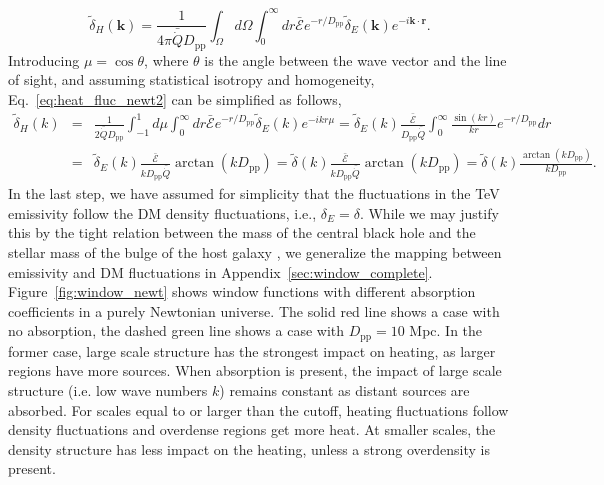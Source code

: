 \documentclass[numberedappendix]{emulateapj}
\begin{document}
\begin{equation}
  \label{eq:heat_fluc_newt2}
  \tilde{\delta}_H(\mathbf{k})=\frac{1}{4\pi\bar{\dot{Q}}D_{\mathrm{pp}}} \int_{\Omega}d\Omega\int_0^{\infty}  dr \bar{ \mathcal{E}} e^{- r/D_{\mathrm{pp}}}  \tilde{\delta}_E(\mathbf{k}) e^{-i\mathbf{k}\cdot{\mathbf{r}}}.
\end{equation}
Introducing $\mu=\cos\theta$, where $\theta$ is the angle between the wave vector and the line of sight, and assuming statistical isotropy and homogeneity, Eq.~\eqref{eq:heat_fluc_newt2} can be simplified as follows,
\begin{eqnarray}
  \label{eq:heat_fluc_newt3}
  \tilde{\delta}_H(k)&=&  
  \frac{1}{2\bar{\dot{Q}}D_{\mathrm{pp}}} \int_{-1}^{1} d\mu \int_0^{\infty}dr  \bar{\mathcal{E}} e^{-r/D_{\mathrm{pp}}} \tilde{\delta}_E(k) e^{-ikr\mu}
  =\tilde{\delta}_E(k)\frac{\bar{\mathcal{E}}}{D_{\mathrm{pp}} \bar{\dot{Q}}}\int_0^{\infty} \frac{\sin(kr)}{kr} e^{-r/D_{\mathrm{pp}}}   dr\\ \nonumber
 &=&\tilde{\delta}_E(k)\frac{\bar{\mathcal{E}}}{k D_{\mathrm{pp}}\bar{\dot{Q}}} \arctan\left(k D_{\mathrm{pp}}\right)
  =\tilde{\delta}(k)\frac{\bar{\mathcal{E}}}{k D_{\mathrm{pp}} \bar{\dot{Q}}} \arctan\left(k D_{\mathrm{pp}}\right)
  = \tilde{\delta}(k)\frac{\arctan\left(k D_{\mathrm{pp}}\right)}{k D_{\mathrm{pp}}} .
\end{eqnarray}
In the last step, we have assumed for simplicity that the fluctuations in the TeV emissivity follow the DM density fluctuations, i.e., $\delta_E=\delta$. While we may justify this by the tight relation between the mass of the central black hole and the stellar mass of the bulge of the host galaxy \citep{2004ApJ...604L..89H}, we generalize the mapping between emissivity and DM fluctuations in Appendix~\ref{sec:window_complete}. Figure~\ref{fig:window_newt} shows  window functions with different absorption coefficients in a purely Newtonian universe. The solid red line shows a case with no absorption, the dashed green line shows a case with $D_{\mathrm{pp}}=10$ Mpc.  In the former case, large scale structure has the strongest impact on heating, as larger regions have more sources. When absorption is present,  the impact of large scale structure (i.e. low wave numbers $k$) remains constant as distant sources are absorbed. For scales equal to or larger than the cutoff, heating fluctuations follow density fluctuations and overdense regions get more heat. At smaller scales, the density structure has less impact on the heating, unless a strong overdensity is present.  
\end{document}

